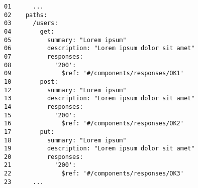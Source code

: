 \begin{figure}[t]
    \centering
        \begin{lstlisting}[style=htmlcssjs, label=lst:cleaning_data:properties_for_operations, caption=Snippet of a OAS document in YAML defining services on the /users endpoint each with same description and summary ,captionpos=b]
01      ...
02    paths:
03      /users:
04        get:
05          summary: "Lorem ipsum"
06          description: "Lorem ipsum dolor sit amet"
07          responses:
08            '200':
09              $ref: '#/components/responses/OK1'
10        post:
12          summary: "Lorem ipsum"
13          description: "Lorem ipsum dolor sit amet"
14          responses:
15            '200':
16              $ref: '#/components/responses/OK2'
17        put:
18          summary: "Lorem ipsum"
19          description: "Lorem ipsum dolor sit amet"
20          responses:
21            '200':
22              $ref: '#/components/responses/OK3'
23      ...
        \end{lstlisting}
\end{figure}